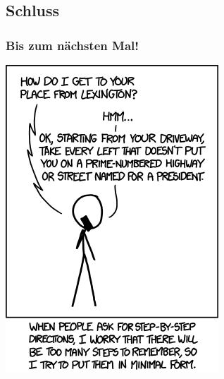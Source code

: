 \subsection{Schluss}
\begin{frame}
\frametitle{Bis zum nächsten Mal!}
\begin{center}
	\includegraphics[height=0.85\textheight]{images/kolmogorov_directions.png}
\end{center}
\end{frame}

